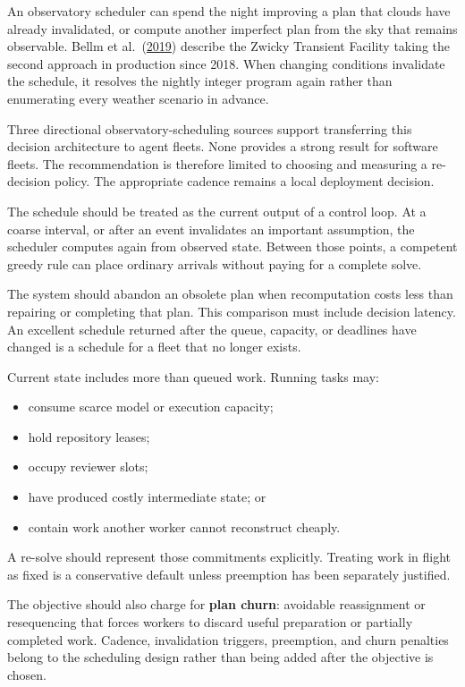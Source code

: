 An observatory scheduler can spend the night improving a plan that clouds have already invalidated, or compute another imperfect plan from the sky that remains observable. Bellm et al.~(\href{https://arxiv.org/abs/1905.02209}{2019}) describe the Zwicky Transient Facility taking the second approach in production since 2018. When changing conditions invalidate the schedule, it resolves the nightly integer program again rather than enumerating every weather scenario in advance.

Three directional observatory-scheduling sources support transferring this decision architecture to agent fleets. None provides a strong result for software fleets. The recommendation is therefore limited to choosing and measuring a re-decision policy. The appropriate cadence remains a local deployment decision.

The schedule should be treated as the current output of a control loop. At a coarse interval, or after an event invalidates an important assumption, the scheduler computes again from observed state. Between those points, a competent greedy rule can place ordinary arrivals without paying for a complete solve.

The system should abandon an obsolete plan when recomputation costs less than repairing or completing that plan. This comparison must include decision latency. An excellent schedule returned after the queue, capacity, or deadlines have changed is a schedule for a fleet that no longer exists.


Current state includes more than queued work. Running tasks may:

\begin{itemize}
\tightlist
\item
  consume scarce model or execution capacity;
\item
  hold repository leases;
\item
  occupy reviewer slots;
\item
  have produced costly intermediate state; or
\item
  contain work another worker cannot reconstruct cheaply.
\end{itemize}

A re-solve should represent those commitments explicitly. Treating work in flight as fixed is a conservative default unless preemption has been separately justified.

The objective should also charge for \textbf{plan churn}: avoidable reassignment or resequencing that forces workers to discard useful preparation or partially completed work. Cadence, invalidation triggers, preemption, and churn penalties belong to the scheduling design rather than being added after the objective is chosen.

